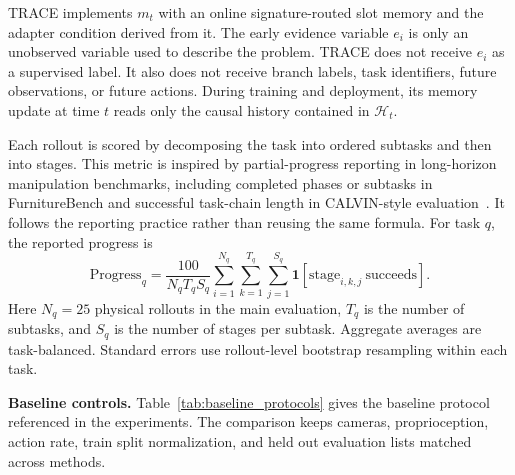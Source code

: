 \documentclass{article}
\begin{document}
TRACE implements $m_t$ with an online signature-routed slot memory and the adapter condition derived from it. The early evidence variable $e_i$ is only an unobserved variable used to describe the problem. TRACE does not receive $e_i$ as a supervised label. It also does not receive branch labels, task identifiers, future observations, or future actions. During training and deployment, its memory update at time $t$ reads only the causal history contained in $\mathcal{H}_t$.

Each rollout is scored by decomposing the task into ordered subtasks and then into stages. This metric is inspired by partial-progress reporting in long-horizon manipulation benchmarks, including completed phases or subtasks in FurnitureBench and successful task-chain length in CALVIN-style evaluation~\citep{heo2023furniturebench,mees2022calvin}. It follows the reporting practice rather than reusing the same formula. For task $q$, the reported progress is
\begin{equation}
    \mathrm{Progress}_q
    =
    \frac{100}{N_qT_qS_q}
    \sum_{i=1}^{N_q}
    \sum_{k=1}^{T_q}
    \sum_{j=1}^{S_q}
    \mathbf{1}\!\left[
    \mathrm{stage}_{i,k,j}\ \mathrm{succeeds}
    \right].
    \label{eq:stage_progress}
\end{equation}
Here $N_q{=}25$ physical rollouts in the main evaluation, $T_q$ is the number of subtasks, and $S_q$ is the number of stages per subtask. Aggregate averages are task-balanced. Standard errors use rollout-level bootstrap resampling within each task.

\textbf{Baseline controls.}
\label{app:baseline_protocols}
Table~\ref{tab:baseline_protocols} gives the baseline protocol referenced in the experiments. The comparison keeps cameras, proprioception, action rate, train split normalization, and held out evaluation lists matched across methods.
\end{document}
